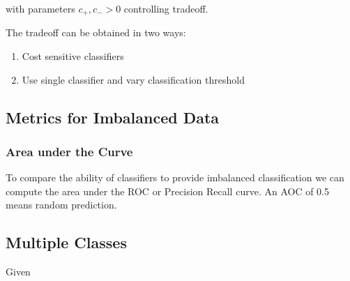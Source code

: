 \documentclass[8pt,a4paper]{scrartcl}
\begin{document}
\begin{multicols*}{3}
with parameters $c_+,c_->0$ controlling tradeoff.

The tradeoff can be obtained in two ways:

\begin{enumerate}
\ncompaq
\item Cost sensitive classifiers
\item Use single classifier and vary classification threshold

\end{enumerate}


\subsection{Metrics for Imbalanced Data}


\subsubsection{Area under the Curve}


To compare the ability of classifiers to provide imbalanced classification we can compute the area under the ROC or Precision Recall curve. An AOC of 0.5 means random prediction.

\subsection{Multiple Classes}

Given


\end{multicols*}
\end{document}
